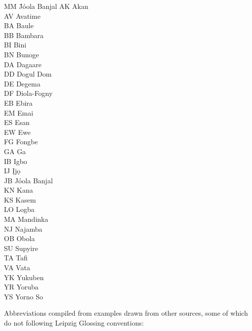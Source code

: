\documentclass[output=paper,colorlinks,citecolor=brown]{langscibook}
\begin{document}
\begin{multicols}{3}
\begin{tabbing}
MM \= Jóola Banjal\kill
AK \> Akan \\
AV \> Avatime \\
BA \> Baule \\
BB \> Bambara \\
BI \> Bini \\
BN \> Bunoge \\
DA \> Dagaare \\
DD \> Dogul Dom \\
DE \> Degema \\
DF \> Diola-Fogny \\
EB \> Ebira \\
EM \> Emai \\
ES \> Esan \\
EW \> Ewe \\
FG \> Fongbe \\
GA \> Ga \\
IB \> Igbo \\
IJ \> Ịjọ \\
JB \> Jóola Banjal \\
KN \> Kana \\
KS \> Kasem \\
LO \> Logba \\
MA \> Mandinka \\
NJ \> Najamba \\
OB \> Obola \\
SU \> Supyire \\
TA \> Tafi \\
VA \> Vata \\
YK \> Yukuben \\
YR \> Yoruba \\
YS \> Yorno So
\end{tabbing}
\end{multicols}

\noindent Abbreviations compiled from examples drawn from other sources, some of which do not following Leipzig Glossing conventions:
\end{document}
